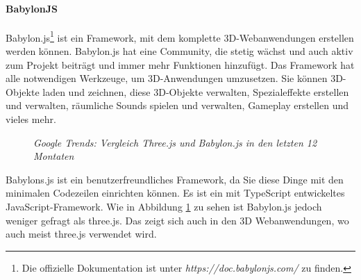 \paragraph{BabylonJS}
\label{sec:babylonJS}
%
Babylon.js\footnote{Die offizielle Dokumentation ist unter \textit{https://doc.babylonjs.com/} zu finden.} ist ein Framework, mit dem komplette 3D-Webanwendungen erstellen werden können. Babylon.js hat eine Community, die stetig wächst und auch aktiv zum Projekt beiträgt und immer mehr Funktionen hinzufügt. Das Framework hat alle notwendigen Werkzeuge, um 3D-Anwendungen umzusetzen. Sie können 3D-Objekte laden und zeichnen, diese 3D-Objekte verwalten, Spezialeffekte erstellen und verwalten, räumliche Sounds spielen und verwalten, Gameplay erstellen und vieles mehr. 
%
\begin{figure}[h]
	\centering
	{}
	\caption[Audi Konfigurator]{\textit{Google Trends: Vergleich Three.js und Babylon.js in den letzten 12 Montaten}}
	\label{fig:compare3dframework}
\end{figure}
%
Babylons.js ist ein benutzerfreundliches Framework, da Sie diese Dinge mit den minimalen Codezeilen einrichten können. Es ist ein mit TypeScript entwickeltes JavaScript-Framework. \cite{moreau-mathis_babylon.js_2016} Wie in Abbildung \ref{fig:compare3dframework} zu sehen ist Babylon.js jedoch weniger gefragt als three.js. Das zeigt sich auch in den 3D Webanwendungen, wo auch meist three.js verwendet wird.
